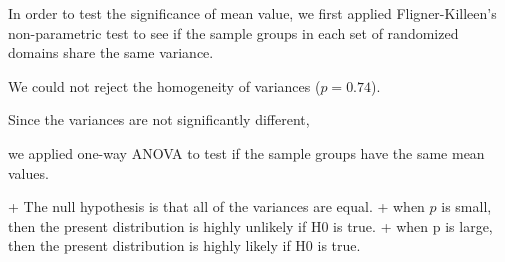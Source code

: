

In order to test the significance of mean value,
we first applied Fligner-Killeen's non-parametric test to see if the sample groups 
in each set of randomized domains share the same variance.


We could not reject the homogeneity of variances ($p=0.74$).

Since the variances are not significantly different,

we applied one-way ANOVA to test if
the sample groups have the same mean values.








+ The null hypothesis is that all of the variances are equal.
+ when $p$ is small, then the present distribution is highly unlikely if H0 is true.
+ when p is large, then the present distribution is highly likely if H0 is true.

